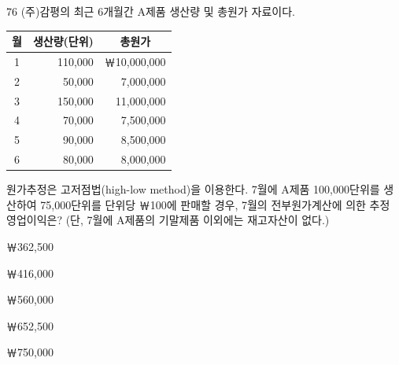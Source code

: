 \begin{question}{76}
(주)감평의 최근 6개월간 A제품 생산량 및 총원가 자료이다.
\par{\small\centering\begin{tabular}{|c|r|r|}
\hline
\multicolumn{1}{|c|}{월} & \multicolumn{1}{c|}{생산량(단위)} & \multicolumn{1}{c|}{총원가} \\ \hline
1 & 110,000 & ￦10,000,000 \\
2 & 50,000 & 7,000,000 \\
3 & 150,000 & 11,000,000 \\
4 & 70,000 & 7,500,000 \\
5 & 90,000 & 8,500,000 \\
6 & 80,000 & 8,000,000 \\ \hline
\end{tabular}\par}
원가추정은 고저점법(high-low method)을 이용한다. 7월에 A제품 100,000단위를 생산하여 75,000단위를 단위당 ￦100에 판매할 경우, 7월의 전부원가계산에 의한 추정 영업이익은? (단, 7월에 A제품의 기말제품 이외에는 재고자산이 없다.) \par
\begin{choices}
  \item ￦362,500
  \item ￦416,000
  \item ￦560,000
  \item ￦652,500
  \item ￦750,000
\end{choices}
\end{question}
